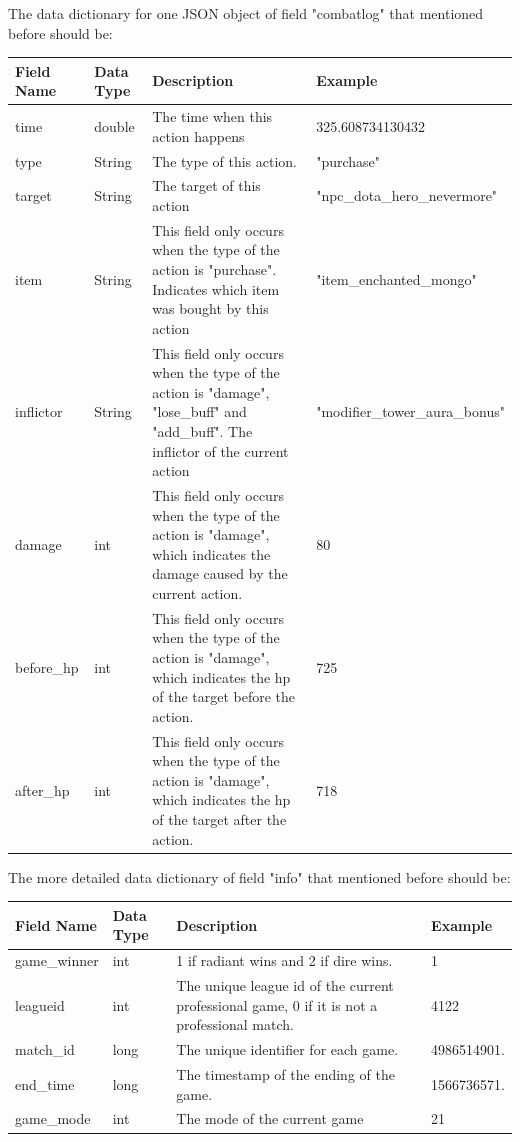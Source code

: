 \documentclass{article}
\begin{document}
The data dictionary for one JSON object of field "combatlog" that mentioned before should be: \\

\begin{tabular}{|p{3cm}|p{2cm}|p{5cm}|p{3cm}|}
\hline
Field Name& Data Type& Description & Example\\
\hline
time & double & The time when this action happens & 325.608734130432 \\
\hline
type & String & The type of this action. & "purchase" \\
\hline
target & String & The target of this action & "npc\_dota\_hero\_nevermore" \\
\hline
item & String & This field only occurs when the type of the action is "purchase". Indicates which item was bought by this action & "item\_enchanted\_mongo" \\
\hline
inflictor & String & This field only occurs when the type of the action is "damage", "lose\_buff" and "add\_buff". The inflictor of the current action & "modifier\_tower\_aura\_bonus" \\
\hline
damage & int & This field only occurs when the type of the action is "damage", which indicates the damage caused by the current action. & 80 \\
\hline
before\_hp & int &  This field only occurs when the type of the action is "damage", which indicates the hp of the target before the action. & 725 \\
\hline
after\_hp & int &  This field only occurs when the type of the action is "damage", which indicates the hp of the target after the action. & 718 \\
\hline
\end{tabular}

The more detailed data dictionary of field "info" that mentioned before should be: \\
\begin{tabular}{|p{3cm}|p{2cm}|p{5cm}|p{3cm}|}
\hline
Field Name& Data Type& Description & Example\\
\hline
game\_winner & int & 1 if radiant wins and 2 if dire wins. & 1 \\
\hline
leagueid & int & The unique league id of the current professional game, 0 if it is not a professional match. & 4122 \\
\hline
match\_id & long & The unique identifier for each game. & 4986514901. \\
\hline
end\_time & long & The timestamp of the ending of the game. & 1566736571. \\
\hline
game\_mode & int & The mode of the current game & 21 \\
\hline
\end{tabular}
\end{document}
